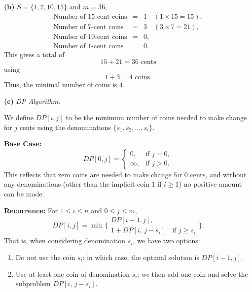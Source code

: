 \documentclass[11pt]{article}
\begin{document}
    \medskip
    
    \textbf{(b)} \(S=\{1, 7, 10, 15\}\) and \(m=36\),
    \[
    \begin{array}{rcl}
    \text{Number of 15-cent coins} &=& 1 \quad (1\times15=15),\\[1mm]
    \text{Number of 7-cent coins}  &=& 3 \quad (3\times7=21),\\[1mm]
    \text{Number of 10-cent coins} &=& 0,\\[1mm]
    \text{Number of 1-cent coins}  &=& 0.
    \end{array}
    \]
    This gives a total of 
    \[
    15+21=36 \text{ cents}
    \]
    using 
    \[
    1+3=4 \text{ coins}.
    \]
    Thus, the minimal number of coins is \(\boxed{4}\).
    
    \medskip
    
    \textbf{(c)} \emph{DP Algorithm:}
    
    We define \(DP[i,j]\) to be the minimum number of coins needed to make change for \(j\) cents using the denominations \(\{s_1, s_2, \dots, s_i\}\).
    
    \medskip
    
    \underline{\textbf{Base Case:}}
    \[
    DP[0,j]=
    \begin{cases}
    0, & \text{if } j=0,\\[1mm]
    \infty, & \text{if } j>0.
    \end{cases}
    \]
    This reflects that zero coins are needed to make change for 0 cents, and without any denominations (other than the implicit coin \(1\) if \(i\ge 1\)) no positive amount can be made.
    
    \medskip
    
    \underline{\textbf{Recurrence:}}
    For \(1\le i\le n\) and \(0\le j\le m\),
    \[
    DP[i,j] = \min \Biggl\{
    \begin{array}{l}
    DP[i-1,j],\\[1mm]
    1 + DP[i,\, j-s_i] \quad \text{if } j\ge s_i
    \end{array}
    \Biggr\}.
    \]
    That is, when considering denomination \(s_i\), we have two options:
    \begin{enumerate}
        \item Do not use the coin \(s_i\): in which case, the optimal solution is \(DP[i-1,j]\).
        \item Use at least one coin of denomination \(s_i\): we then add one coin and solve the subproblem \(DP[i,\, j-s_i]\).
    \end{enumerate}
    
\end{document}
